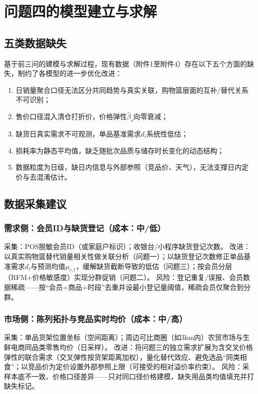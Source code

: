 \section{问题四的模型建立与求解}

\subsection{五类数据缺失}

基于前三问的建模与求解过程，现有数据（附件1至附件4）存在以下五个方面的缺失，制约了各模型的进一步优化改进：

\begin{enumerate}
    \item 日销量聚合口径无法区分共同趋势与真实关联，购物篮层面的互补/替代关系不可识别；
    \item 售价口径混入清仓打折价，价格弹性$\hat{\beta}_c$向零衰减；
    \item 缺货日真实需求不可观测，单品基准需求$d_i$系统性低估；
    \item 损耗率为静态平均值，缺乏随批次品质与储存时长变化的动态结构；
    \item 数据粒度为日级，缺日内信息与外部参照（竞品价、天气），无法支撑日内定价与去混淆估计。
\end{enumerate}

\subsection{数据采集建议}
\subsubsection{需求侧：会员ID与缺货登记（成本：中/低）}
采集：POS脱敏会员ID（或家庭户标识）；收银台/小程序缺货登记次数。
改进：以真实购物篮替代销量相关性做关联分析（问题一）；以缺货登记次数修正单品基准需求$d_i$与预测均值$\mu_{c,t}$，缓解缺货截断导致的低估（问题三）；按会员分层（RFM+价格敏感度）实现分群促销（问题二）。
风险：登记重复/误报、会员数据稀疏——按“会员+商品+时段”去重并设最小登记量阈值，稀疏会员仅聚合到分群。

\subsubsection{市场侧：陈列拓扑与竞品实时均价（成本：中/高）}
采集：单品货架位置坐标（空间距离）；周边可比商圈（如3km内）农贸市场与生鲜电商同品类零售均价（日采样）。
改进：将问题三的独立需求扩展为含交叉价格弹性的联合需求（交叉弹性按货架距离加权），量化替代效应、避免选品“同类相食”；以竞品价为定价设置外部参照上限（可接受的相对溢价率约束）。
风险：采样本底不一致、价格口径差异——只对同口径价格建模，缺失用品类均值填充并打缺失标记。

